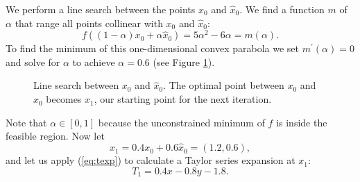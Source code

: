 We perform a line search between the points $x_0$ and $\hat{x}_0$.
We find a function $m$ of $\alpha$ that range all points collinear with $x_0$
and $\hat{x}_0$:
\[
f((1-\alpha) x_0 + \alpha \hat{x}_0) = 5\alpha^2 - 6\alpha = m(\alpha).
\]
To find the minimum of this one-dimensional convex parabola we set
$m^\prime(\alpha) = 0$ and solve for $\alpha$ to achieve $\alpha = 0.6$
(see Figure \ref{fig:steplength}).
\begin{figure}[ht!]
    \centering
    
    \caption{Line search between $x_0$ and $\hat{x}_0$. The optimal point
             between $x_0$ and $\hat{x}_0$ becomes $x_1$, our starting point
             for the next iteration.}
    \label{fig:steplength}
\end{figure}
Note that $\alpha \in [0, 1]$ because the unconstrained minimum of $f$ is
inside the feasible region.
Now let
\[
x_1 = 0.4x_0 + 0.6\hat{x}_0 = (1.2, 0.6),
\]
and let us apply (\ref{eq:texp}) to calculate a Taylor series
expansion at $x_1$:
\[
    T_1 = 0.4x - 0.8y - 1.8.
\]

